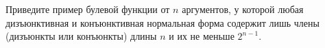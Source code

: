 Приведите пример булевой функции от $n$ аргументов, у которой любая дизъюнктивная и конъюнктивная
нормальная форма содержит лишь члены (дизъюнкты или конъюнкты) длины $n$ и их не меньше $2^{n - 1}$.
